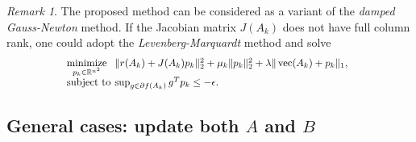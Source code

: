 \documentclass[letterpaper,10pt,journal,final]{IEEEtran}
\theoremstyle{definition}
\theoremstyle{remark}
\newtheorem{remark}{Remark}
\newcommand{\kvec}{\operatorname{vec}}
\newcommand{\minimize}[1]{\underset{#1}{\operatorname{minimize}}}  \newcommand{\st}{\operatorname{subject\ to}}
\begin{document}
\begin{remark}
  The proposed method can be considered as a variant of the \emph{damped Gauss-Newton} method.
If the Jacobian matrix \(J(A_k)\) does not have full column rank, one could
  adopt the \emph{Levenberg-Marquardt} method
and solve
  \begin{equation*}
\hspace*{-1.3mm}
    \scalebox{0.9}{\(
      \begin{array}{l@{\:\,}l}
        \minimize{p_k \in \mathbb{R}^{n^2}} &\|r(A_k) + J(A_k) p_k\|_2^2 + \mu_k \|p_k\|_2^2 + \lambda \|\kvec(A_k) + p_k\|_1,\\
        \st & \sup_{g \in \partial f(A_k)} g^T p_k \leq -\epsilon.
      \end{array}
      \)}
  \end{equation*}
\end{remark}



\subsection{General cases: update both $A$ and $B$}
\label{subsec:general-case:-update-AB}
\end{document}
